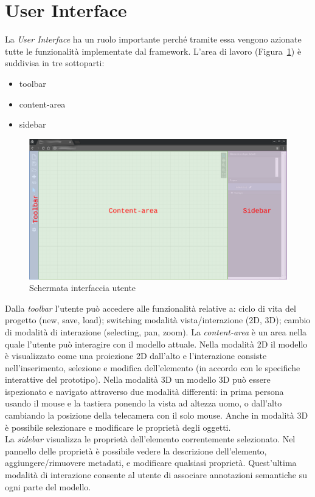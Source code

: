 \section{User Interface}
\label{sec:chapter_2_section_2}

La \emph{User Interface} ha un ruolo importante perché tramite essa vengono azionate tutte le funzionalità
implementate dal framework. L'area di lavoro (Figura~\ref{fig:interfaccia}) è suddivisa in tre sottoparti:
\begin{itemize}
  \item toolbar
  \item content-area
  \item sidebar
\end{itemize}

\begin{figure}[htbp] %
   \centering
   \includegraphics[width=1\linewidth]{images/mock-interfaccia}
   \caption{Schermata interfaccia utente}
   \label{fig:interfaccia}
\end{figure}

Dalla \emph{toolbar} l'utente pu\`o accedere alle funzionalit\`a relative a: ciclo di vita del progetto (new, save, load);
switching modalità vista/interazione (2D, 3D); cambio di modalità di interazione (selecting, pan, zoom).
\newpage
La \emph{content-area} \`e un area nella quale l'utente pu\`o interagire con il modello attuale. Nella modalit\`a 2D
il modello \`e visualizzato come una proiezione 2D dall'alto e l'interazione consiste nell'inserimento, selezione e modifica
dell'elemento (in accordo con le specifiche interattive del prototipo). Nella modalità 3D un modello 3D pu\`o essere
ispezionato e navigato attraverso due modalità differenti: in prima persona usando il mouse e la tastiera ponendo la vista
ad altezza uomo, o dall'alto cambiando la posizione della telecamera con il solo mouse. Anche in modalità 3D è possibile
selezionare e modificare le proprietà degli oggetti.\\
\indent
La \emph{sidebar} visualizza le propriet\`a dell'elemento correntemente selezionato. Nel pannello delle propriet\`a \`e possibile
vedere la descrizione dell'elemento, aggiungere/rimuovere metadati, e modificare qualsiasi propriet\`a.
Quest'ultima modalità di interazione consente al utente di associare annotazioni semantiche su ogni parte del modello.
\newpage

